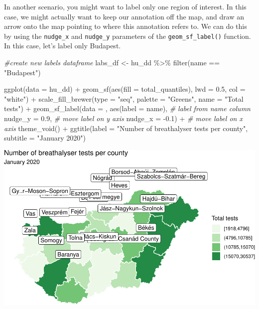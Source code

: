 \documentclass[
]{book}
\makeatletter
\newenvironment{Shaded}{\begin{snugshade}}{\end{snugshade}}
\newcommand{\AttributeTok}[1]{\textcolor[rgb]{0.61,0.61,0.61}{#1}}
\newcommand{\CommentTok}[1]{\textcolor[rgb]{0.37,0.37,0.37}{\textit{#1}}}
\newcommand{\FloatTok}[1]{\textcolor[rgb]{0.06,0.06,0.06}{#1}}
\newcommand{\FunctionTok}[1]{\textcolor[rgb]{0,0,0}{#1}}
\newcommand{\NormalTok}[1]{#1}
\newcommand{\OtherTok}[1]{\textcolor[rgb]{0.37,0.37,0.37}{#1}}
\newcommand{\SpecialCharTok}[1]{\textcolor[rgb]{0,0,0}{#1}}
\newcommand{\StringTok}[1]{\textcolor[rgb]{0.5,0.5,0.5}{#1}}
\newenvironment{kframe}{%
\medskip{}
\setlength{\fboxsep}{.8em}
 \def\at@end@of@kframe{}%
 \ifinner\ifhmode%
  \def\at@end@of@kframe{\end{minipage}}%
  \begin{minipage}{\columnwidth}%
 \fi\fi%
 \def\FrameCommand##1{\hskip\@totalleftmargin \hskip-\fboxsep
 \colorbox{shadecolor}{##1}\hskip-\fboxsep
     \hskip-\linewidth \hskip-\@totalleftmargin \hskip\columnwidth}%
 \MakeFramed {\advance\hsize-\width
   \@totalleftmargin\z@ \linewidth\hsize
   \@setminipage}}%
 {\par\unskip\endMakeFramed%
 \at@end@of@kframe}
\renewenvironment{Shaded}{\begin{kframe}}{\end{kframe}}
\makeatother
\begin{document}
In another scenario, you might want to label only one region of interest. In this case, we might actually want to keep our annotation off the map, and draw an arrow onto the map pointing to where this annotation refers to. We can do this by using the \texttt{nudge\_x} and \texttt{nudge\_y} parameters of the \texttt{geom\_sf\_label()} function. In this case, let's label only Budapest.

\begin{Shaded}
\begin{Highlighting}[]
\CommentTok{\#create new labels dataframe}
\NormalTok{labs\_df }\OtherTok{\textless{}{-}}\NormalTok{ hu\_dd }\SpecialCharTok{\%\textgreater{}\%} \FunctionTok{filter}\NormalTok{(name }\SpecialCharTok{==} \StringTok{"Budapest"}\NormalTok{)}

\FunctionTok{ggplot}\NormalTok{(}\AttributeTok{data =}\NormalTok{ hu\_dd) }\SpecialCharTok{+} 
  \FunctionTok{geom\_sf}\NormalTok{(}\FunctionTok{aes}\NormalTok{(}\AttributeTok{fill =}\NormalTok{ total\_quantiles), }
          \AttributeTok{lwd =} \FloatTok{0.5}\NormalTok{, }\AttributeTok{col =} \StringTok{"white"}\NormalTok{) }\SpecialCharTok{+} 
  \FunctionTok{scale\_fill\_brewer}\NormalTok{(}\AttributeTok{type =} \StringTok{"seq"}\NormalTok{, }
                    \AttributeTok{palette =} \StringTok{"Greens"}\NormalTok{,}
                    \AttributeTok{name =} \StringTok{"Total tests"}\NormalTok{) }\SpecialCharTok{+} 
  \FunctionTok{geom\_sf\_label}\NormalTok{(}\AttributeTok{data =}\NormalTok{ , }\FunctionTok{aes}\NormalTok{(}\AttributeTok{label =}\NormalTok{ name), }\CommentTok{\# label from name column}
                \AttributeTok{nudge\_y =} \FloatTok{0.9}\NormalTok{,  }\CommentTok{\# move label on y axis}
                \AttributeTok{nudge\_x =} \SpecialCharTok{{-}}\FloatTok{0.1}\NormalTok{) }\SpecialCharTok{+} \CommentTok{\# move label on x axis}
  \FunctionTok{theme\_void}\NormalTok{() }\SpecialCharTok{+} 
  \FunctionTok{ggtitle}\NormalTok{(}\AttributeTok{label =} \StringTok{"Number of breathalyser tests per county"}\NormalTok{, }
          \AttributeTok{subtitle =} \StringTok{"January 2020"}\NormalTok{)}
\end{Highlighting}
\end{Shaded}

\includegraphics{crime_mapping_files/figure-latex/addcountynamesBPonly-1.pdf}
\end{document}
